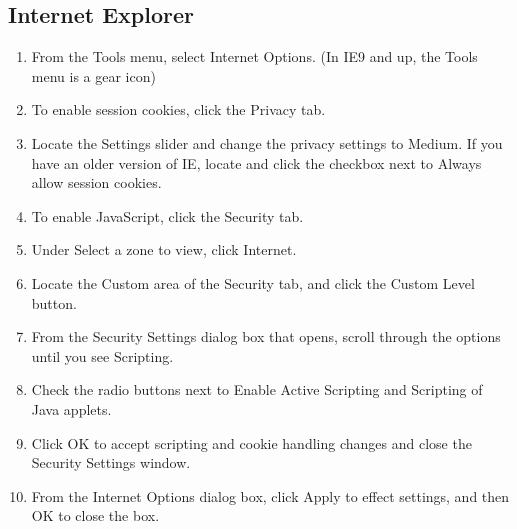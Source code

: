 \documentclass[hidelinks,english]{article}
\begin{document}
        \subsection{Internet Explorer}
            \begin{enumerate}
                \item From the Tools menu, select Internet Options. (In IE9 and up, the Tools menu is a gear icon)
                \item To enable session cookies, click the Privacy tab.
                \item Locate the Settings slider and change the privacy settings to Medium. If you have an older version of IE, locate and click the checkbox next to Always allow session cookies.
                \item To enable JavaScript, click the Security tab.
                \item Under Select a zone to view, click Internet.
                \item Locate the Custom area of the Security tab, and click the Custom Level button.
                \item From the Security Settings dialog box that opens, scroll through the options until you see Scripting.
                \item Check the radio buttons next to Enable Active Scripting and Scripting of Java applets.
                \item Click OK to accept scripting and cookie handling changes and close the Security Settings window.
                \item From the Internet Options dialog box, click Apply to effect settings, and then OK to close the box.
            \end{enumerate}
\end{document}
